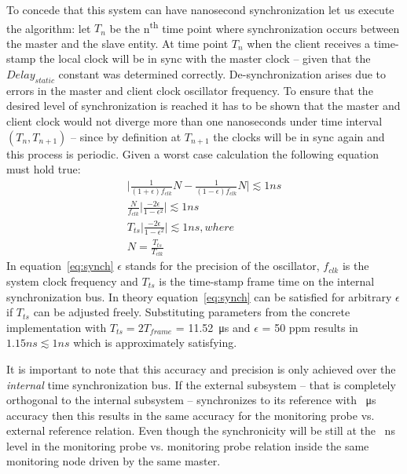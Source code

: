 \documentclass[journal]{IEEEtran}
\begin{document}
To concede that this system can have nanosecond synchronization let us execute the algorithm: let $T_n$ be the n\textsuperscript{th} time point where synchronization occurs between the master and the slave entity. At time point $T_n$ when the client receives a time-stamp the local clock will be in sync with
the master clock -- given that the $Delay_{static}$ constant was determined correctly. De-synchronization arises due to errors in the master and client clock oscillator frequency. 
To ensure that the desired level of synchronization is reached it has to be shown that the master and client clock would not diverge more than one nanoseconds 
under time interval $(T_n,T_{n+1})$  -- since by definition at $T_{n+1}$ the clocks will be in sync again and this process is periodic. Given a worst case calculation the
following equation must hold true:
\begin{equation}\label{eq:synch}
\begin{aligned} 
\bigg\lvert \frac{1}{(1+\epsilon)f_{clk}}N - \frac{1}{(1-\epsilon)f_{clk}}N  \bigg\rvert  \lesssim 1 ns \\
\frac{N}{f_{clk}} \bigg\lvert \frac{-2\epsilon}{1 - \epsilon ^2} \bigg\rvert \lesssim 1 ns \\
T_{ts} \bigg\lvert \frac{-2\epsilon}{1 - \epsilon ^2} \bigg\rvert \lesssim 1 ns , where \\
N = \frac{T_{ts}}{T_{clk}}
\end{aligned}
\end{equation}
In equation~\ref{eq:synch} $\epsilon$ stands for the precision of the oscillator, $f_{clk}$  is the system clock frequency and $T_{ts}$ is the time-stamp frame time on the internal synchronization bus. In theory equation~\ref{eq:synch} can be satisfied for arbitrary $\epsilon$ if $T_{ts}$ can be adjusted freely. Substituting parameters from the concrete implementation with $T_{ts} = 2T_{frame}$ = \SI{11.52}{\micro\second} and $\epsilon$ = 50 ppm results in $1.15 ns \lesssim 1 ns$ which is approximately satisfying.


It is important to note that this accuracy and precision is only achieved over the \emph{internal} time synchronization bus. If the external subsystem -- that is completely orthogonal to the internal subsystem -- synchronizes to its reference with \SI{}{\micro\second} accuracy then this results in the same accuracy for the monitoring probe vs. external reference relation. Even though the synchronicity will be still at the \SI{}{\nano\second} level in the monitoring probe vs. monitoring probe relation inside the same monitoring node driven by the same master.
\end{document}
